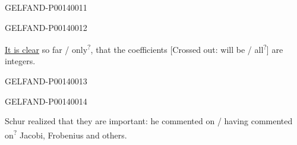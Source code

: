 \begin{GelfandAdjacentEvidence}{GELFAND-P001400}{11}

\end{GelfandAdjacentEvidence}
\begin{GelfandAdjacentEvidence}{GELFAND-P001400}{12}



\uline{It is clear} so far / only\textsuperscript{?},
that the coefficients [Crossed out:
will be / all\textsuperscript{?}] are integers.

\end{GelfandAdjacentEvidence}
\begin{GelfandAdjacentEvidence}{GELFAND-P001400}{13}

\end{GelfandAdjacentEvidence}
\begin{GelfandAdjacentEvidence}{GELFAND-P001400}{14}



Schur realized that they are important:
he commented on / having commented on\textsuperscript{?} Jacobi, Frobenius and others.

\end{GelfandAdjacentEvidence}



